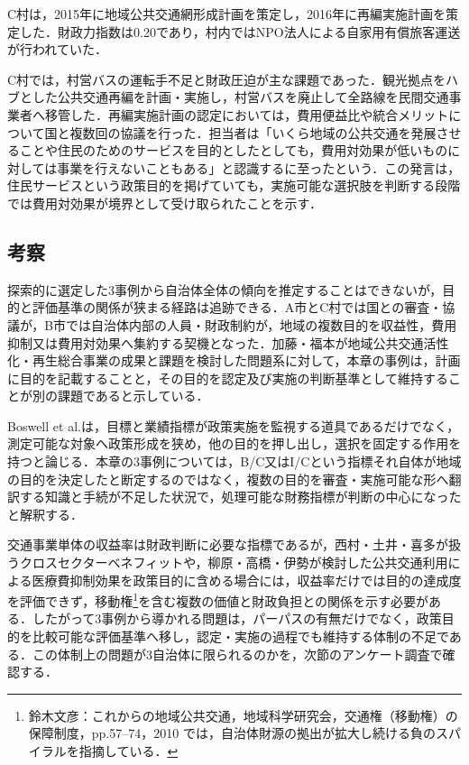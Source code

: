 C村は，2015年に地域公共交通網形成計画を策定し，2016年に再編実施計画を策定した．財政力指数は0.20であり，村内ではNPO法人による自家用有償旅客運送が行われていた．

C村では，村営バスの運転手不足と財政圧迫が主な課題であった．観光拠点をハブとした公共交通再編を計画・実施し，村営バスを廃止して全路線を民間交通事業者へ移管した．再編実施計画の認定においては，費用便益比や統合メリットについて国と複数回の協議を行った．担当者は「いくら地域の公共交通を発展させることや住民のためのサービスを目的としたとしても，費用対効果が低いものに対しては事業を行えないこともある」と認識するに至ったという．この発言は，住民サービスという政策目的を掲げていても，実施可能な選択肢を判断する段階では費用対効果が境界として受け取られたことを示す．

\subsection{考察}
\label{subsec:ch5_interview_discussion}

探索的に選定した3事例から自治体全体の傾向を推定することはできないが，目的と評価基準の関係が狭まる経路は追跡できる．A市とC村では国との審査・協議が，B市では自治体内部の人員・財政制約が，地域の複数目的を収益性，費用抑制又は費用対効果へ集約する契機となった．加藤・福本\cite{kato2013}が地域公共交通活性化・再生総合事業の成果と課題を検討した問題系に対して，本章の事例は，計画に目的を記載することと，その目的を認定及び実施の判断基準として維持することが別の課題であると示している．

Boswell et al.\cite{boswell2015effects}は，目標と業績指標が政策実施を監視する道具であるだけでなく，測定可能な対象へ政策形成を狭め，他の目的を押し出し，選択を固定する作用を持つと論じる．本章の3事例については，B/C又はI/Cという指標それ自体が地域の目的を決定したと断定するのではなく，複数の目的を審査・実施可能な形へ翻訳する知識と手続が不足した状況で，処理可能な財務指標が判断の中心になったと解釈する．

交通事業単体の収益率は財政判断に必要な指標であるが，西村・土井・喜多\cite{nishimura2014}が扱うクロスセクターベネフィットや，柳原・高橋・伊勢\cite{yanagihara2023}が検討した公共交通利用による医療費抑制効果を政策目的に含める場合には，収益率だけでは目的の達成度を評価できず，移動権\footnote{鈴木文彦：これからの地域公共交通，地域科学研究会，交通権（移動権）の保障制度，pp.57--74，2010 では，自治体財源の拠出が拡大し続ける負のスパイラルを指摘している．}を含む複数の価値と財政負担との関係を示す必要がある．したがって3事例から導かれる問題は，パーパスの有無だけでなく，政策目的を比較可能な評価基準へ移し，認定・実施の過程でも維持する体制の不足である．この体制上の問題が3自治体に限られるのかを，次節のアンケート調査で確認する．

